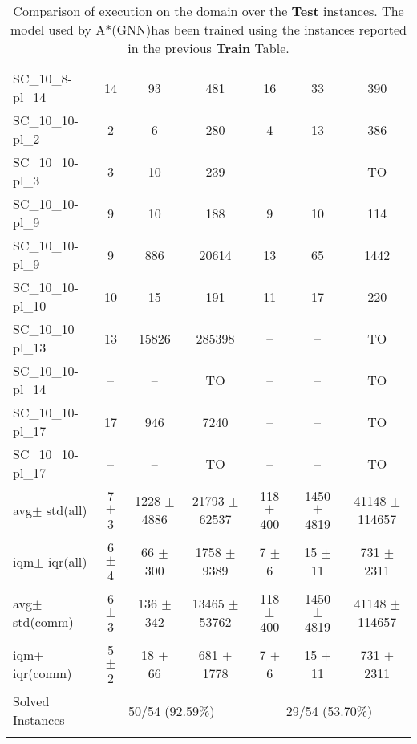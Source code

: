 \documentclass{article}
\newcommand{\GNNres}{A*(GNN)}
\newcommand{\unsolvedColumn}{--}
\newcommand{\myTO}{TO}
\newcommand{\myAvg}{avg}
\newcommand{\myStd}{std}
\newcommand{\IQM}{iqm}
\newcommand{\IQR}{iqr}
\newcommand{\allInstances}{all}
\newcommand{\onlyInCommon}{comm}
\begin{document}
\begin{longtable}[!ht]{l|ccc|ccc}
SC\_10\_8-pl\_14 & 14 & 93 & 481 & 16 & 33 & 390 \\
SC\_10\_10-pl\_2 & 2 & 6 & 280 & 4 & 13 & 386 \\
SC\_10\_10-pl\_3 & 3 & 10 & 239 & \unsolvedColumn & \unsolvedColumn & \myTO \\
SC\_10\_10-pl\_9 & 9 & 10 & 188 & 9 & 10 & 114 \\
SC\_10\_10-pl\_9 & 9 & 886 & 20614 & 13 & 65 & 1442 \\
SC\_10\_10-pl\_10 & 10 & 15 & 191 & 11 & 17 & 220 \\
SC\_10\_10-pl\_13 & 13 & 15826 & 285398 & \unsolvedColumn & \unsolvedColumn & \myTO \\
SC\_10\_10-pl\_14 & \unsolvedColumn & \unsolvedColumn & \myTO & \unsolvedColumn & \unsolvedColumn & \myTO \\
SC\_10\_10-pl\_17 & 17 & 946 & 7240 & \unsolvedColumn & \unsolvedColumn & \myTO \\
SC\_10\_10-pl\_17 & \unsolvedColumn & \unsolvedColumn & \myTO & \unsolvedColumn & \unsolvedColumn & \myTO \\
\hline
\myAvg  $\pm$ \myStd \hfill (\allInstances) & 7 $\pm$ 3 & 1228 $\pm$ 4886 & 21793 $\pm$ 62537 & 118 $\pm$ 400 & 1450 $\pm$ 4819 & 41148 $\pm$ 114657 \\
\IQM $\pm$ \IQR \hfill (\allInstances) & 6 $\pm$ 4 & 66 $\pm$ 300 & 1758 $\pm$ 9389 & 7 $\pm$ 6 & 15 $\pm$ 11 & 731 $\pm$ 2311 \\
\myAvg  $\pm$ \myStd \hfill (\onlyInCommon) & 6 $\pm$ 3 & 136 $\pm$ 342 & 13465 $\pm$ 53762 & 118 $\pm$ 400 & 1450 $\pm$ 4819 & 41148 $\pm$ 114657 \\
\IQM $\pm$ \IQR \hfill (\onlyInCommon) & 5 $\pm$ 2 & 18 $\pm$ 66 & 681 $\pm$ 1778 & 7 $\pm$ 6 & 15 $\pm$ 11 & 731 $\pm$ 2311 \\
Solved Instances & \multicolumn{3}{c|}{50/54 (92.59\%)} & \multicolumn{3}{c}{29/54 (53.70\%)}
\\
\caption{Comparison of execution on the {} domain over the \textbf{Test} instances. The model used by \GNNres has been trained using the instances reported in the previous \textbf{Train} Table.}
\label{tab:{final_reports}_{}_comparison_test}
\end{longtable}
\end{document}
